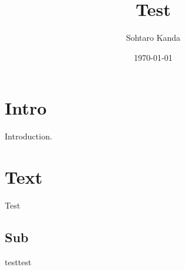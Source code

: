 \documentclass{article}
\title{Test}
\author{Sohtaro Kanda}
\date{\today}
\begin{document}
\maketitle
\section{Intro}
Introduction.
\section{Text}
Test
\subsection{Sub}
testtest
\end{document}
